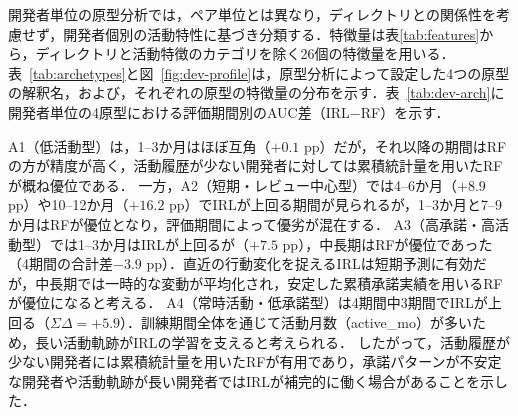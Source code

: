 \documentclass[submit]{ipsj}
\begin{document}
\begin{figure}[t]
\end{figure}

開発者単位の原型分析では，ペア単位とは異なり，ディレクトリとの関係性を考慮せず，開発者個別の活動特性に基づき分類する．特徴量は表\ref{tab:features}から，ディレクトリと活動特徴のカテゴリを除く26個の特徴量を用いる．
表~\ref{tab:archetypes}と図~\ref{fig:dev-profile}は，原型分析によって設定した4つの原型の解釈名，および，それぞれの原型の特徴量の分布を示す．表~\ref{tab:dev-arch}に開発者単位の4原型における評価期間別のAUC差（IRL$-$RF）を示す．

A1（低活動型）は，1--3か月はほぼ互角（$+0.1$ pp）だが，それ以降の期間はRFの方が精度が高く，活動履歴が少ない開発者に対しては累積統計量を用いたRFが概ね優位である．
一方，A2（短期・レビュー中心型）では4--6か月（$+8.9$ pp）や10--12か月（$+16.2$ pp）でIRLが上回る期間が見られるが，1--3か月と7--9か月はRFが優位となり，評価期間によって優劣が混在する．
A3（高承諾・高活動型）では1--3か月はIRLが上回るが（$+7.5$ pp），中長期はRFが優位であった（4期間の合計差$-3.9$ pp）．直近の行動変化を捉えるIRLは短期予測に有効だが，中長期では一時的な変動が平均化され，安定した累積承諾実績を用いるRFが優位になると考える．
A4（常時活動・低承諾型）は4期間中3期間でIRLが上回る（$\Sigma\Delta = +5.9$）．訓練期間全体を通じて活動月数（active\_mo）が多いため，長い活動軌跡がIRLの学習を支えると考えられる．
したがって，活動履歴が少ない開発者には累積統計量を用いたRFが有用であり，承諾パターンが不安定な開発者や活動軌跡が長い開発者ではIRLが補完的に働く場合があることを示した．



\end{document}
